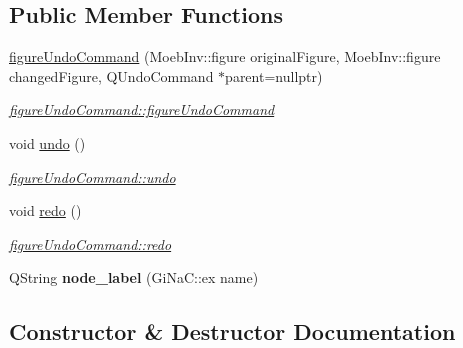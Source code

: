 \subsection*{Public Member Functions}
\begin{DoxyCompactItemize}
\item 
\mbox{\hyperlink{classfigure_undo_command_af29d6f2ed7bcff9fdae44a83707d0d76}{figure\+Undo\+Command}} (Moeb\+Inv\+::figure original\+Figure, Moeb\+Inv\+::figure changed\+Figure, Q\+Undo\+Command $\ast$parent=nullptr)
\begin{DoxyCompactList}\small\item\em \mbox{\hyperlink{classfigure_undo_command_af29d6f2ed7bcff9fdae44a83707d0d76}{figure\+Undo\+Command\+::figure\+Undo\+Command}} \end{DoxyCompactList}\item 
void \mbox{\hyperlink{classfigure_undo_command_a9e733f81f847b07673f141bf13c5aace}{undo}} ()
\begin{DoxyCompactList}\small\item\em \mbox{\hyperlink{classfigure_undo_command_a9e733f81f847b07673f141bf13c5aace}{figure\+Undo\+Command\+::undo}} \end{DoxyCompactList}\item 
void \mbox{\hyperlink{classfigure_undo_command_aec81e1bda86663871b7ff1cb6e8d5fda}{redo}} ()
\begin{DoxyCompactList}\small\item\em \mbox{\hyperlink{classfigure_undo_command_aec81e1bda86663871b7ff1cb6e8d5fda}{figure\+Undo\+Command\+::redo}} \end{DoxyCompactList}\item 
\mbox{\label{classfigure_undo_command_a571773dcb5236289e16f0d444e9785e5}} 
Q\+String {\bfseries node\+\_\+label} (Gi\+Na\+C\+::ex name)
\end{DoxyCompactItemize}


\subsection{Constructor \& Destructor Documentation}
\mbox{\label{classfigure_undo_command_af29d6f2ed7bcff9fdae44a83707d0d76}} 
